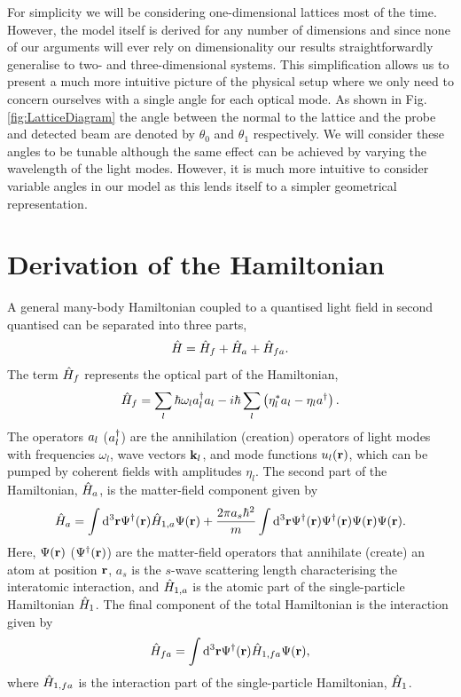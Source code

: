 For simplicity we will be considering one-dimensional lattices most of
the time. However, the model itself is derived for any number of
dimensions and since none of our arguments will ever rely on
dimensionality our results straightforwardly generalise to two- and
three-dimensional systems. This simplification allows us to present a
much more intuitive picture of the physical setup where we only need
to concern ourselves with a single angle for each optical mode. As
shown in Fig. \ref{fig:LatticeDiagram} the angle between the normal to
the lattice and the probe and detected beam are denoted by $\theta_0$
and $\theta_1$ respectively. We will consider these angles to be
tunable although the same effect can be achieved by varying the
wavelength of the light modes. However, it is much more intuitive to
consider variable angles in our model as this lends itself to a
simpler geometrical representation.

\section{Derivation of the Hamiltonian}
\label{sec:derivation}

A general many-body Hamiltonian coupled to a quantised light field in
second quantised can be separated into three parts,
\begin{equation}
\label{eq:FullH}
  \hat{H} = \hat{H}_f + \hat{H}_a + \hat{H}_{fa}.
\end{equation}
The term $\hat{H}_f$ represents the optical part of the Hamiltonian,
\begin{equation}
\label{eq:Hf}
  \hat{H}_f = \sum_l \hbar \omega_l a^\dagger_l a_l -
  i \hbar \sum_l \left( \eta_l^* a_l - \eta_l a^\dagger \right).
\end{equation}
The operators $a_l$ ($a^\dagger_l$) are the annihilation (creation)
operators of light modes with frequencies $\omega_l$, wave vectors
$\mathbf{k}_l$, and mode functions $u_l(\mathbf{r})$, which can be pumped by
coherent fields with amplitudes $\eta_l$. The second part of the
Hamiltonian, $\hat{H}_a$, is the matter-field component given by
\begin{equation}
\label{eq:Ha}
  \hat{H}_a = \int \mathrm{d}^3 \mathbf{r} \Psi^\dagger(\mathbf{r}) \hat{H}_{1,a}
  \Psi(\mathbf{r}) + \frac{2 \pi a_s \hbar^2}{m} \int \mathrm{d}^3 \mathbf{r}
  \Psi^\dagger(\mathbf{r}) \Psi^\dagger(\mathbf{r}) \Psi(\mathbf{r}) \Psi(\mathbf{r}).
\end{equation}
Here, $\Psi(\mathbf{r})$ ($\Psi^\dagger(\mathbf{r})$) are the matter-field
operators that annihilate (create) an atom at position $\mathbf{r}$, $a_s$
is the $s$-wave scattering length characterising the interatomic
interaction, and $\hat{H}_{1,a}$ is the atomic part of the single-particle
Hamiltonian $\hat{H}_1$. The final component of the total Hamiltonian is
the interaction given by 
\begin{equation}
  \label{eq:Hfa}
  \hat{H}_{fa} = \int \mathrm{d}^3 \mathbf{r} \Psi^\dagger(\mathbf{r}) \hat{H}_{1,fa}
  \Psi(\mathbf{r}),
\end{equation}
where $\hat{H}_{1,fa}$ is the interaction part of the single-particle
Hamiltonian, $\hat{H}_1$.

